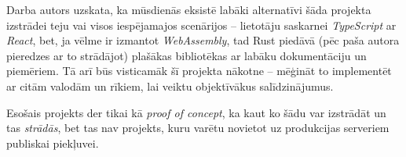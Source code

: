 Darba autors uzskata, ka mūsdienās eksistē labāki alternatīvi šāda projekta
izstrādei teju vai visos iespējamajos scenārijos -- lietotāju saskarnei \emph{TypeScript}
ar \emph{React}, bet, ja vēlme ir izmantot \emph{WebAssembly}, tad Rust piedāvā (pēc paša autora pieredzes
ar to strādājot) plašākas bibliotēkas ar labāku dokumentāciju un piemēriem. Tā arī būs visticamāk šī
projekta nākotne -- mēģināt to implementēt ar citām valodām un rīkiem, lai veiktu objektīvākus
salīdzinājumus.

Esošais projekts der tikai kā \emph{proof of concept}, ka kaut ko šādu var izstrādāt
un tas \emph{strādās}, bet tas nav projekts, kuru varētu novietot uz produkcijas
serveriem publiskai piekļuvei.
